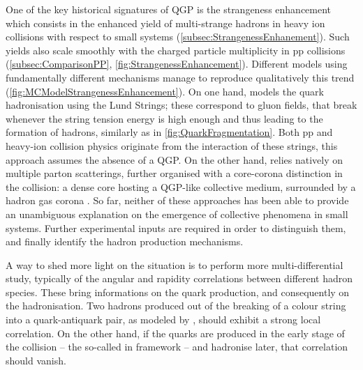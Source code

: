 One of the key historical signatures of QGP is the strangeness enhancement which consists in the enhanced yield of multi-strange hadrons in heavy ion collisions with respect to small systems (\Sec\ref{subsec:StrangenessEnhanement}). Such yields also scale smoothly with the charged particle multiplicity in pp collisions (\Sec\ref{subsec:ComparisonPP}, \fig\ref{fig:StrangenessEnhancement}). Different models using fundamentally different mechanisms manage to reproduce qualitatively this trend (\fig\ref{fig:MCModelStrangenessEnhancement}). On one hand, \Pythia \cite{bierlichComprehensiveGuidePhysics2022}\cite{skandsTuningPYTHIAMonash2014} models the quark hadronisation using the Lund Strings; these correspond to gluon fields, that break whenever the string tension energy is high enough and thus leading to the formation of hadrons, similarly as in \fig\ref{fig:QuarkFragmentation}. Both pp and heavy-ion collision physics originate from the interaction of these strings, \ie this approach assumes the absence of a QGP. On the other hand, \Epos \cite{wernerCorecoronaProcedureMicrocanonical2023} relies natively on multiple parton scatterings, further organised with a core-corona distinction in the collision: a dense core hosting a QGP-like collective medium, surrounded by a hadron gas corona \cite{wernerAnalysingRadialFlow2014}. So far, neither of these approaches has been able to provide an unambiguous explanation on the emergence of collective phenomena in small systems. Further experimental inputs are required in order to distinguish them, and finally identify the hadron production mechanisms. 

A way to shed more light on the situation is to perform more multi-differential study, typically of the angular and rapidity correlations between different hadron species. These bring informations on the quark production, and consequently on the hadronisation. Two hadrons produced out of the breaking of a colour string into a quark-antiquark pair, as modeled by \Pythia, should exhibit a strong local correlation. On the other hand, if the quarks are produced in the early stage of the collision -- the so-called  in \Epos framework \cite{wernerCorecoronaProcedureMicrocanonical2023} -- and hadronise later, that correlation should vanish.

